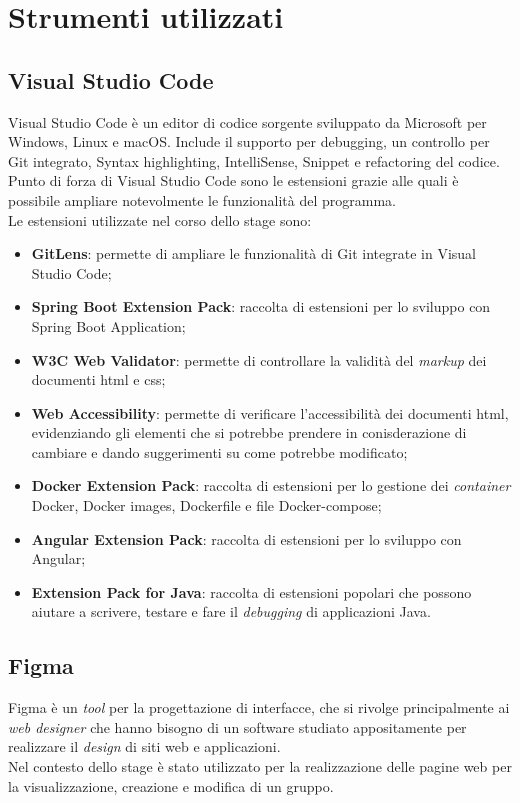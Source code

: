 \section{Strumenti utilizzati}
\subsection{Visual Studio Code}
Visual Studio Code è un editor di codice sorgente sviluppato da Microsoft per Windows, Linux e macOS. 
Include il supporto per debugging, un controllo per Git integrato, Syntax highlighting, IntelliSense, 
Snippet e refactoring del codice.\\
Punto di forza di Visual Studio Code sono le estensioni grazie alle quali è possibile ampliare 
notevolmente le funzionalità del programma.\\
Le estensioni utilizzate nel corso dello stage sono:
    \begin{itemize}
        \item \textbf{GitLens}: permette di ampliare le funzionalità di Git integrate in Visual Studio Code;
        \item \textbf{Spring Boot Extension Pack}: raccolta di estensioni per lo sviluppo con Spring Boot Application;
        \item \textbf{W3C Web Validator}: permette di controllare la validità del \textit{markup} dei documenti html e css;
        \item \textbf{Web Accessibility}: permette di verificare l'accessibilità dei documenti html, evidenziando gli 
        elementi che si potrebbe prendere in conisderazione di cambiare e dando suggerimenti su come potrebbe modificato;
        \item \textbf{Docker Extension Pack}: raccolta di estensioni per lo gestione dei \textit{container} Docker, Docker images, Dockerfile e file Docker-compose;
        \item \textbf{Angular Extension Pack}: raccolta di estensioni per lo sviluppo con Angular;
        \item \textbf{Extension Pack for Java}: raccolta di estensioni popolari che possono aiutare a scrivere, testare e fare il
        \textit{debugging} di applicazioni Java.
    \end{itemize}
\subsection{Figma}
Figma è un \textit{tool} per la progettazione di interfacce, che si rivolge principalmente ai \textit{web designer} che hanno bisogno di un software studiato 
appositamente per realizzare il \textit{design} di siti web e applicazioni.\\
Nel contesto dello stage è stato utilizzato per la realizzazione delle pagine web per la visualizzazione, creazione e modifica di un gruppo. 
